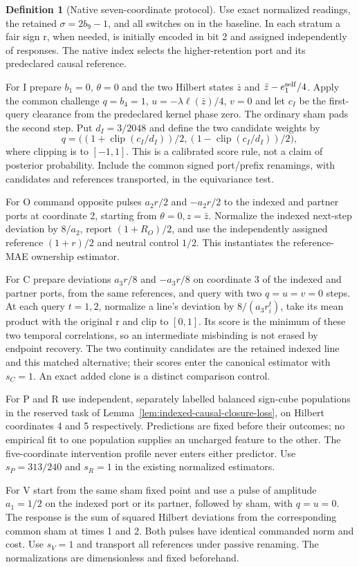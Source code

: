\documentclass[11pt,a4paper]{article}
\theoremstyle{definition}
\newtheorem{definition}[theorem]{Definition}
\begin{document}
\begin{definition}[Native seven-coordinate protocol]
\label{def:native-seven-protocol}
Use exact normalized readings, the retained $\sigma=2b_9-1$, and all switches
on in the baseline. In each stratum a fair sign r, when needed, is initially
encoded in bit 2 and assigned independently of responses. The native index
selects the higher-retention port and its predeclared causal reference.

For I prepare $b_1=0$, $\theta=0$ and the two Hilbert states $\bar z$ and
$\bar z-e_1^{\rm self}/4$. Apply the common challenge
$q=b_4=1$, $u=-\lambda\ell(\bar z)/4$, $v=0$ and let $c_I$ be the
first-query clearance from the predeclared kernel phase zero. The ordinary
sham pads the second step. Put $d_I=3/2048$ and define the
two candidate weights by
\[
 q=\bigl((1+\operatorname{clip}(c_I/d_I))/2,
         (1-\operatorname{clip}(c_I/d_I))/2\bigr),
\]
where clipping is to $[-1,1]$. This is a calibrated score rule, not a claim
of posterior probability. Include the common signed port/prefix renamings,
with candidates and references transported, in the equivariance test.

For O command opposite pulses $a_2r/2$ and $-a_2r/2$ to the indexed and
partner ports at coordinate 2, starting from $\theta=0,z=\bar z$.
Normalize the indexed next-step deviation by $8/a_2$, report $(1+R_O)/2$,
and use the independently assigned reference $(1+r)/2$ and neutral control
$1/2$. This instantiates the reference-MAE ownership estimator.

For C prepare deviations $a_3r/8$ and $-a_3r/8$ on coordinate 3 of the
indexed and partner ports, from the same references, and query with two
$q=u=v=0$ steps. At each query $t=1,2$, normalize a line's deviation by
$8/(a_3r_i^t)$, take its mean product with the original r and clip to $[0,1]$.
Its score is the minimum of these two temporal correlations, so an intermediate
misbinding is not erased by endpoint recovery. The two continuity candidates are the retained indexed line
and this matched alternative; their scores enter the canonical estimator
with $s_C=1$. An exact added clone is a distinct comparison control.

For P and R use independent, separately labelled balanced sign-cube populations
in the reserved task of Lemma~\ref{lem:indexed-causal-closure-loss}, on Hilbert
coordinates 4 and 5 respectively. Predictions are fixed before their outcomes;
no empirical fit to one population supplies an uncharged feature to the other.
The five-coordinate intervention profile never enters either predictor.
Use $s_P=313/240$ and $s_R=1$ in the existing normalized estimators.

For V start from the same sham fixed point and use a pulse of amplitude
$a_1=1/2$ on the indexed port or its partner, followed by sham, with
$q=u=0$. The response is the sum of squared Hilbert deviations from the
corresponding common sham at times 1 and 2. Both pulses have identical
commanded norm and cost. Use $s_V=1$ and transport all references under
passive renaming. The normalizations are dimensionless and fixed beforehand.
\end{definition}
\end{document}
